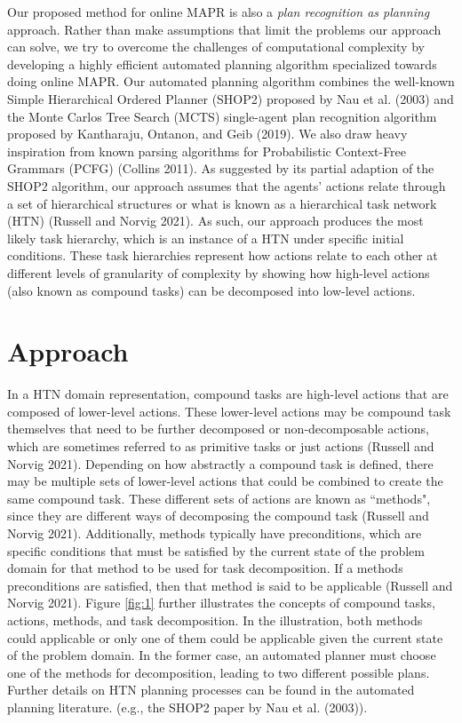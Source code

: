Our proposed method for online MAPR is also a \textit{plan recognition as planning} approach. Rather than make assumptions that limit the problems our approach can solve, we try to overcome the challenges of computational complexity by developing a highly efficient automated planning algorithm specialized towards doing online MAPR. Our automated planning algorithm combines the well-known Simple Hierarchical Ordered Planner (SHOP2) proposed by Nau et al. (2003) and the Monte Carlos Tree Search (MCTS) single-agent plan recognition algorithm proposed by Kantharaju, Ontanon, and Geib (2019). We also draw heavy inspiration from known parsing algorithms for Probabilistic Context-Free Grammars (PCFG) (Collins 2011). As suggested by its partial adaption of the SHOP2 algorithm, our approach assumes that the agents' actions relate through a set of hierarchical structures or what is known as a hierarchical task network (HTN) (Russell and Norvig 2021). As such, our approach produces the most likely task hierarchy, which is an instance of a HTN under specific initial conditions. These task hierarchies represent how actions relate to each other at different levels of granularity of complexity by showing how high-level actions (also known as compound tasks) can be decomposed into low-level actions. 

\section{Approach}
In a HTN domain representation, compound tasks are high-level actions that are composed of lower-level actions. These lower-level actions may be compound task themselves that need to be further decomposed or non-decomposable actions, which are sometimes referred to as primitive tasks or just actions (Russell and Norvig 2021). Depending on how abstractly a compound task is defined, there may be multiple sets of lower-level actions that could be combined to create the same compound task. These different sets of actions are known as ``methods", since they are different ways of decomposing the compound task (Russell and Norvig 2021). Additionally, methods typically have preconditions, which are specific conditions that must be satisfied by the current state of the problem domain for that method to be used for task decomposition. If a methods preconditions are satisfied, then that method is said to be applicable (Russell and Norvig 2021). Figure \ref{fig:1} further illustrates the concepts of compound tasks, actions, methods, and task decomposition. In the illustration, both methods could applicable or only one of them could be applicable given the current state of the problem domain. In the former case, an automated planner must choose one of the methods for decomposition, leading to two different possible plans. Further details on HTN planning processes can be found in the automated planning literature. (e.g., the SHOP2 paper by Nau et al. (2003)). 

